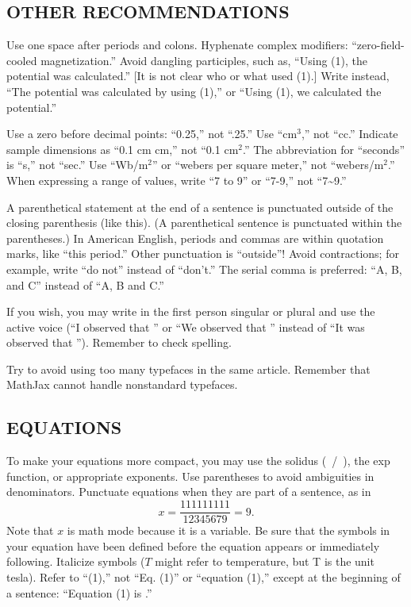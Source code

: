 \documentclass{ieeetmlcn}
\begin{document}
\subsection{OTHER RECOMMENDATIONS}
Use one space after periods and colons. Hyphenate complex modifiers:
``zero-field-cooled magnetization.'' Avoid dangling participles, such as,
``Using (1), the potential was calculated.'' [It is not clear who or what
used (1).] Write instead, ``The potential was calculated by using (1),'' or
``Using (1), we calculated the potential.''

Use a zero before decimal points: ``0.25,'' not ``.25.'' Use ``cm$^3$,'' not
``cc.'' Indicate sample dimensions as ``0.1 cm  cm,'' not
``0.1  cm$^{2}$.'' The abbreviation for ``seconds'' is ``s,''
not ``sec.'' Use ``Wb/m$^{2}$'' or ``webers per square meter,'' not
``webers/m$^2$.'' When expressing a range of values, write ``7 to 9'' or
``7-9,'' not ``7\textasciitilde 9.''

A parenthetical statement at the end of a sentence is punctuated outside of
the closing parenthesis (like this). (A parenthetical sentence is punctuated
within the parentheses.) In American English, periods and commas are within
quotation marks, like ``this period.'' Other punctuation is ``outside''!
Avoid contractions; for example, write ``do not'' instead of ``don't.'' The
serial comma is preferred: ``A, B, and C'' instead of ``A, B and C.''

If you wish, you may write in the first person singular or plural and use
the active voice (``I observed that \textellipsis'' or ``We observed that \textellipsis''
instead of ``It was observed that \textellipsis''). Remember to check spelling.

Try to avoid using too many typefaces in the same article.
Remember that MathJax cannot handle nonstandard typefaces.

\subsection{EQUATIONS}
To make your equations more
compact, you may use the solidus (~/~), the exp function, or appropriate
exponents. Use parentheses to avoid ambiguities in denominators. Punctuate
equations when they are part of a sentence, as in
\begin{equation}
\label{eq1}
x=\frac{111111111}{12345679}=9 .
\end{equation}
Note that $x$ is math mode because it is a variable.
Be sure that the symbols in your equation have been defined before the
equation appears or immediately following. Italicize symbols ($T$ might refer
to temperature, but T is the unit tesla). Refer to ``(1),'' not ``Eq. (1)''
or ``equation (1),'' except at the beginning of a sentence: ``Equation (1)
is \textellipsis .''
\end{document}
